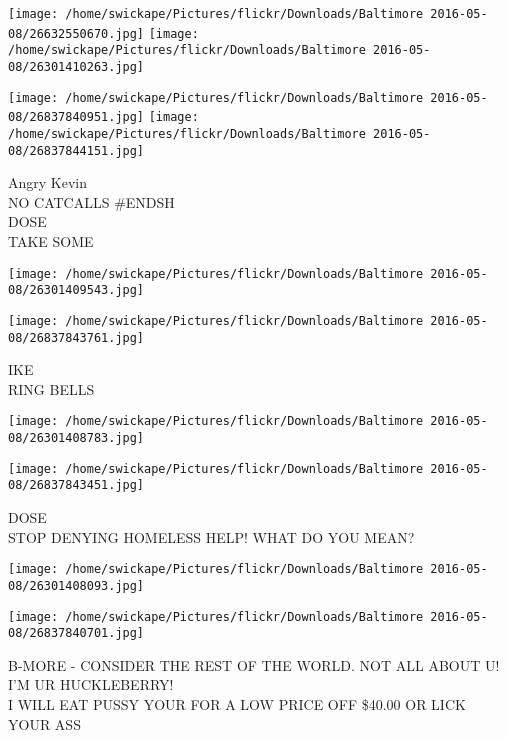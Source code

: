 \documentclass[10pt,letterpaper]{article}
\begin{document}
\texttt{[image: /home/swickape/Pictures/flickr/Downloads/Baltimore 2016-05-08/26632550670.jpg]}
\texttt{[image: /home/swickape/Pictures/flickr/Downloads/Baltimore 2016-05-08/26301410263.jpg]}

\texttt{[image: /home/swickape/Pictures/flickr/Downloads/Baltimore 2016-05-08/26837840951.jpg]}
\texttt{[image: /home/swickape/Pictures/flickr/Downloads/Baltimore 2016-05-08/26837844151.jpg]}

Angry Kevin\\
NO CATCALLS \#ENDSH\\
DOSE\\
TAKE SOME\\
\pagebreak

\texttt{[image: /home/swickape/Pictures/flickr/Downloads/Baltimore 2016-05-08/26301409543.jpg]}

\vspace{0.25in}
\texttt{[image: /home/swickape/Pictures/flickr/Downloads/Baltimore 2016-05-08/26837843761.jpg]}

IKE\\
RING BELLS\\
\pagebreak

\texttt{[image: /home/swickape/Pictures/flickr/Downloads/Baltimore 2016-05-08/26301408783.jpg]}

\vspace{0.25in}
\texttt{[image: /home/swickape/Pictures/flickr/Downloads/Baltimore 2016-05-08/26837843451.jpg]}

DOSE\\
STOP DENYING HOMELESS HELP!  WHAT DO YOU MEAN?\\
\pagebreak

\texttt{[image: /home/swickape/Pictures/flickr/Downloads/Baltimore 2016-05-08/26301408093.jpg]}

\vspace{0.25in}
\texttt{[image: /home/swickape/Pictures/flickr/Downloads/Baltimore 2016-05-08/26837840701.jpg]}

B{-}MORE {-} CONSIDER THE REST OF THE WORLD.  NOT ALL ABOUT U!  I'M UR HUCKLEBERRY!\\
I WILL EAT PUSSY YOUR FOR A LOW PRICE OFF \$40.00 OR LICK YOUR ASS\\
\pagebreak
\end{document}
